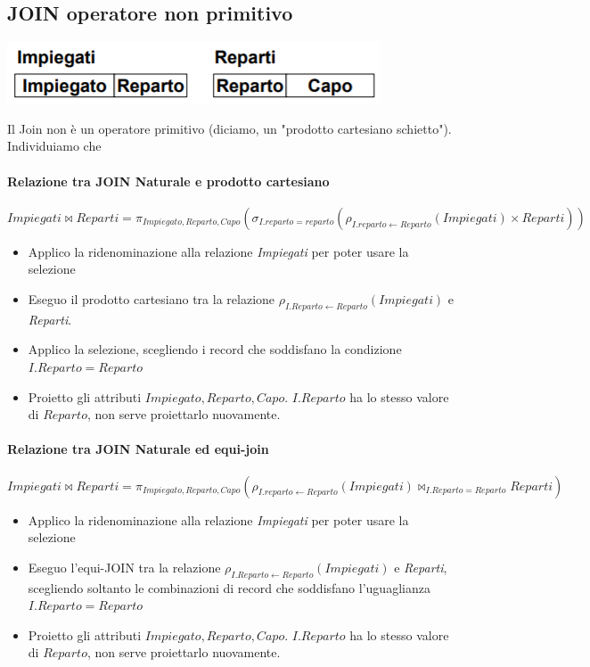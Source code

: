 \subsection{JOIN operatore non primitivo}
\begin{center}
	\includegraphics{images/75.PNG}
\end{center}
Il Join non è un operatore primitivo (diciamo, un "prodotto cartesiano schietto"). Individuiamo che
\paragraph{Relazione tra JOIN Naturale e prodotto cartesiano}
\[Impiegati \Join Reparti = \pi_{Impiegato,Reparto,Capo}(\sigma_{I.reparto=reparto}(\rho_{I.reparto \leftarrow Reparto}(Impiegati) \times Reparti))\]
\begin{itemize}
	\item Applico la ridenominazione alla relazione \emph{Impiegati} per poter usare la selezione
	\item Eseguo il prodotto cartesiano tra la relazione $\rho_{I.Reparto\leftarrow Reparto}(Impiegati)$ e \emph{Reparti}. 
	\item Applico la selezione, scegliendo i record che soddisfano la condizione $I.Reparto=Reparto$
	\item Proietto gli attributi $Impiegato, Reparto, Capo$. $I.Reparto$ ha lo stesso valore di $Reparto$, non serve proiettarlo nuovamente.
\end{itemize}
\paragraph{Relazione tra JOIN Naturale ed equi-join}
\[Impiegati \Join Reparti = \pi_{Impiegato,Reparto,Capo}(\rho_{I.reparto \leftarrow Reparto}(Impiegati) \Join_{I.Reparto=Reparto} Reparti)\]
\begin{itemize}
	\item Applico la ridenominazione alla relazione \emph{Impiegati} per poter usare la selezione
	\item Eseguo l'equi-JOIN tra la relazione $\rho_{I.Reparto\leftarrow Reparto}(Impiegati)$ e \emph{Reparti}, scegliendo soltanto le combinazioni di record che soddisfano l'uguaglianza $I.Reparto=Reparto$
	\item Proietto gli attributi $Impiegato, Reparto, Capo$. $I.Reparto$ ha lo stesso valore di $Reparto$, non serve proiettarlo nuovamente.
\end{itemize}

